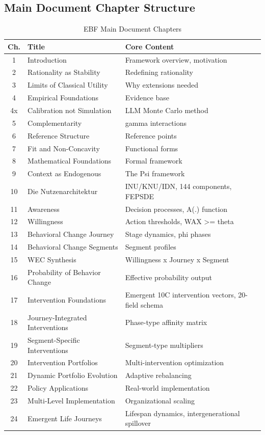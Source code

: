 \subsection{Main Document Chapter Structure}

\begin{table}[htbp]
\centering
\caption{EBF Main Document Chapters}
\label{tab:main-chapters}
\renewcommand{\arraystretch}{1.2}
\small
\begin{tabular}{@{}clp{6cm}@{}}
\toprule
\textbf{Ch.} & \textbf{Title} & \textbf{Core Content} \\
\midrule
1 & Introduction & Framework overview, motivation \\
2 & Rationality as Stability & Redefining rationality \\
3 & Limits of Classical Utility & Why extensions needed \\
4 & Empirical Foundations & Evidence base \\
4x & Calibration not Simulation & LLM Monte Carlo method \\
5 & Complementarity & gamma interactions \\
6 & Reference Structure & Reference points \\
7 & Fit and Non-Concavity & Functional forms \\
8 & Mathematical Foundations & Formal framework \\
9 & Context as Endogenous & The Psi framework \\
10 & Die Nutzenarchitektur & INU/KNU/IDN, 144 components, FEPSDE \\
11 & Awareness & Decision processes, A(.) function \\
12 & Willingness & Action thresholds, WAX >= theta \\
13 & Behavioral Change Journey & Stage dynamics, phi phases \\
14 & Behavioral Change Segments & Segment profiles \\
15 & WEC Synthesis & Willingness x Journey x Segment \\
16 & Probability of Behavior Change & Effective probability output \\
17 & Intervention Foundations & Emergent 10C intervention vectors, 20-field schema \\
18 & Journey-Integrated Interventions & Phase-type affinity matrix \\
19 & Segment-Specific Interventions & Segment-type multipliers \\
20 & Intervention Portfolios & Multi-intervention optimization \\
21 & Dynamic Portfolio Evolution & Adaptive rebalancing \\
22 & Policy Applications & Real-world implementation \\
23 & Multi-Level Implementation & Organizational scaling \\
24 & Emergent Life Journeys & Lifespan dynamics, intergenerational spillover \\
\bottomrule
\end{tabular}
\end{table}

